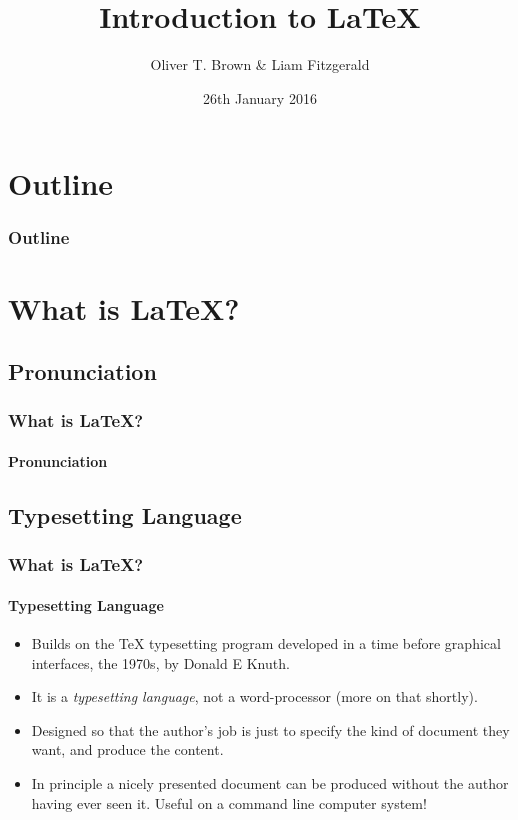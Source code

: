 \documentclass{beamer}
\title{Introduction to \LaTeX}
\author[OTB \& LF]{Oliver T. Brown \& Liam Fitzgerald}
\institute[HWU]{Heriot-Watt University}
\date[2016-01-26]{26th January 2016}
\begin{document}
\begin{frame}
	\titlepage
\end{frame}

\section{Outline}
\begin{frame}
	\frametitle{Outline}
	\tableofcontents
\end{frame}

\section{What is \LaTeX?}

\subsection[LayTECH]{Pronunciation}
\begin{frame}
\frametitle{What is \LaTeX?}
\framesubtitle{Pronunciation}
 \vspace{\baselineskip}

 \vspace{\baselineskip}

 \vspace{\baselineskip}

\end{frame}

\subsection{Typesetting Language}
\begin{frame}
\frametitle{What is \LaTeX?}
\framesubtitle{Typesetting Language}
\begin{itemize}
\item Builds on the TeX typesetting program developed in a time before graphical interfaces, the 1970s, by Donald E Knuth.
\item It is a \emph{typesetting language}, not a word-processor (more on that shortly).
\item Designed so that the author's job is just to specify the kind of document they want, and produce the content.
\item In principle a nicely presented document can be produced without the author having ever seen it. Useful on a command line computer system!
\end{itemize}
\end{frame}
\end{document}
